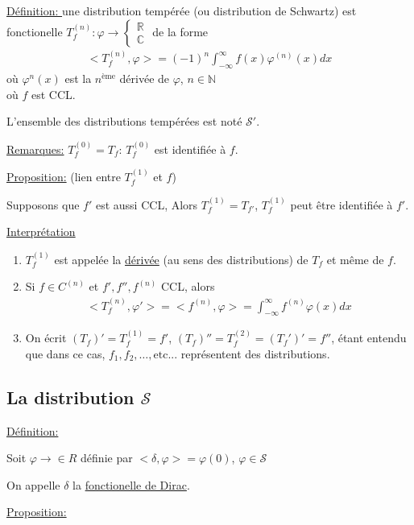 \underline{Définition: }
une distribution tempérée (ou distribution de Schwartz) est fonctionelle $T_f^{(n)}:\varphi\rightarrow
\begin{cases}
	\mathbb R
	\\
	\mathbb C
\end{cases}$
de la forme
\begin{eqnarray}
	<T_f^{(n)},\varphi>=(-1)^n\int_{-\infty}^{\infty}f(x)\varphi^{(n)}(x)dx
\end{eqnarray}
où $\varphi^n(x)$ est la $n^{\text{ème}}$ dérivée de $\varphi$, $n\in\mathbb N$
\\
où $f$ est CCL.

L'ensemble des distributions tempérées est noté $\mathcal S'$. 

\underline{Remarques:}
$T_f^{(0)}=T_f$: $T_f^{(0)}$ est identifiée à $f$.

\underline{Proposition:} (lien entre $T_f^{(1)}$ et $f$)

Supposons que $f'$ est aussi CCL, Alors $T_f^{(1)}=T_{f'}$, $T_f^{(1)}$ peut être identifiée à $f'$.

\underline{Interprétation}
\begin{enumerate}
	\item $T_f^{(1)}$ est appelée la \underline{dérivée} (au sens des distributions) de $T_f$ et même de $f$.
	\item Si $f\in C^{(n)}$ et $f',f'',f^{(n)}$ CCL, alors
	\begin{eqnarray*}
		<T_f^{(n)},\varphi'>=<f^{(n)},\varphi>=\int_{-\infty}^{\infty}f^{(n)}\varphi(x)dx
	\end{eqnarray*}
	\item On écrit $(T_f)'=T_f^{(1)}=f'$, $(T_f)''=T_f^{(2)}=(T_f')'=f''$, étant entendu que dans ce cas, $f_1,f_2,\dots,\text{etc...}$ représentent des distributions.
\end{enumerate}

\subsection{La distribution $\mathcal S$}

\underline{Définition:}

Soit $\varphi\rightarrow\in R$ définie par $<\delta,\varphi>=\varphi(0)$, $\varphi\in\mathcal S$

On appelle $\delta$ la \underline{fonctionelle de Dirac}.

\underline{Proposition:} 

